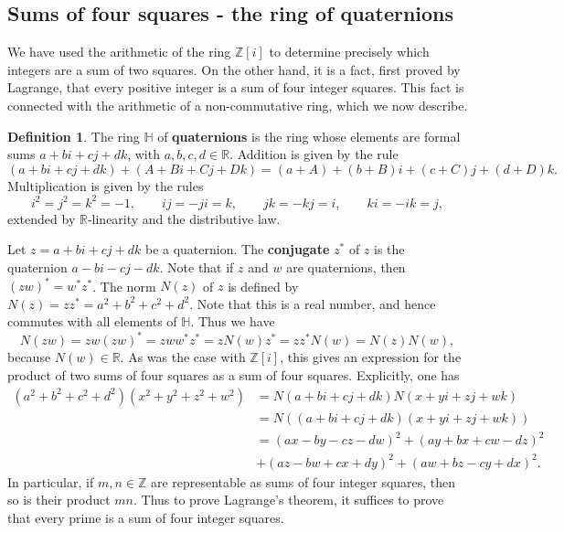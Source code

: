 \documentclass{article}
\newcommand{\Z}{\mathbb{Z}}
\newcommand{\R}{\mathbb{R}}
\renewcommand{\H}{\mathbb{H}}
\newcommand{\rb}[1]{\left( #1 \right)}
\renewcommand{\sb}[1]{\left[ #1 \right]}
\theoremstyle{definition}\newtheorem{definition}{Definition}
\theoremstyle{definition}\newtheorem{remark}[definition]{Remark}
\theoremstyle{definition}\newtheorem*{example}{Example}
\theoremstyle{definition}\newtheorem*{note}{Note}
\begin{document}
\subsection{Sums of four squares - the ring of quaternions}

We have used the arithmetic of the ring $ \Z\sb{i} $ to determine precisely which integers are a sum of two squares. On the other hand, it is a fact, first proved by Lagrange, that every positive integer is a sum of four integer squares. This fact is connected with the arithmetic of a non-commutative ring, which we now describe.

\begin{definition}
The ring $ \H $ of \textbf{quaternions} is the ring whose elements are formal sums $ a + bi + cj + dk $, with $ a, b, c, d \in \R $. Addition is given by the rule
$$ \rb{a + bi + cj + dk} + \rb{A + Bi + Cj + Dk} = \rb{a + A} + \rb{b + B}i + \rb{c + C}j + \rb{d + D}k. $$
Multiplication is given by the rules
$$ i^2 = j^2 = k^2 = -1, \qquad ij = -ji = k, \qquad jk = -kj = i, \qquad ki = -ik = j, $$
extended by $ \R $-linearity and the distributive law.
\end{definition}

Let $ z = a + bi + cj + dk $ be a quaternion. The \textbf{conjugate} $ z^* $ of $ z $ is the quaternion $ a - bi - cj - dk $. Note that if $ z $ and $ w $ are quaternions, then $ \rb{zw}^* = w^*z^* $. The norm $ N\rb{z} $ of $ z $ is defined by $ N\rb{z} = zz^* = a^2 + b^2 + c^2 + d^2 $. Note that this is a real number, and hence commutes with all elements of $ \H $. Thus we have
$$ N\rb{zw} = zw\rb{zw}^* = zww^*z^* =  zN\rb{w}z^* = zz^*N\rb{w} = N\rb{z}N\rb{w}, $$
because $ N\rb{w} \in \R $. As was the case with $ \Z\sb{i} $, this gives an expression for the product of two sums of four squares as a sum of four squares. Explicitly, one has
\begin{align*}
\rb{a^2 + b^2 + c^2 + d^2}\rb{x^2 + y^2 + z^2 + w^2}
& = N\rb{a + bi + cj + dk}N\rb{x + yi + zj + wk} \\
& = N\rb{\rb{a + bi + cj + dk}\rb{x + yi + zj + wk}} \\
& = \rb{ax - by - cz - dw}^2 + \rb{ay + bx + cw - dz}^2 \\
& + \rb{az - bw + cx + dy}^2 + \rb{aw + bz - cy + dx}^2.
\end{align*}
In particular, if $ m, n \in \Z $ are representable as sums of four integer squares, then so is their product $ mn $. Thus to prove Lagrange's theorem, it suffices to prove that every prime is a sum of four integer squares.
\end{document}
